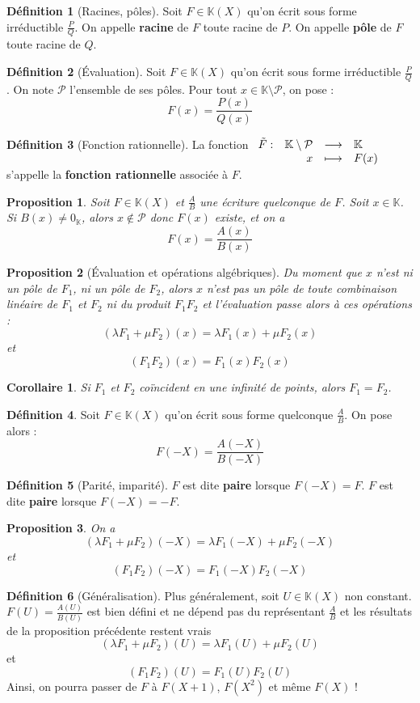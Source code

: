 \documentclass[french]{book}
\newcommand{\K}{\mathbb{K}}
\theoremstyle{plain}
\newtheorem{prop}{Proposition}[chapter]
\newtheorem{cor}{Corollaire}[chapter]
\theoremstyle{definition}
\newtheorem{dfn}{Définition}[chapter]
\theoremstyle{remark}
\begin{document}
\begin{dfn}[Racines, pôles]
	Soit $F\in\K(X)$ qu'on écrit sous forme irréductible $\displaystyle \frac{P}{Q}$. On appelle \textbf{racine} de $F$ toute racine de $P$. On appelle \textbf{pôle} de $F$ toute racine de $Q$.
\end{dfn}
\begin{dfn}[Évaluation]
	Soit $F\in\K(X)$ qu'on écrit sous forme irréductible $\displaystyle \frac{P}{Q}$. On note $\mathcal{P}$ l'ensemble de ses pôles. Pour tout $x\in\K\setminus\mathcal{P}$, on pose : $$F(x)=\frac{P(x)}{Q(x)}$$
\end{dfn}
\begin{dfn}[Fonction rationnelle]
	La fonction $\begin{array}[t]{lrcl}
		\tilde{F}: & \K\setminus\mathcal{P} & \longrightarrow & \K \\
		& x & \longmapsto & F(x)
	\end{array}
	$ s'appelle la \textbf{fonction rationnelle} associée à $F$.
\end{dfn}
\begin{prop}
	Soit $F\in\K(X)$ et $\displaystyle\frac{A}{B}$ une écriture quelconque de $F$. Soit $x\in\K$. Si $B(x)\ne0_\K$, alors $x\notin\mathcal{P}$ donc $F(x)$ existe, et on a $$F(x)=\frac{A(x)}{B(x)}$$
\end{prop}
\begin{prop}[Évaluation et opérations algébriques]
	Du moment que $x$ n'est ni un pôle de $F_1$, ni un pôle de $F_2$, alors $x$ n'est pas un pôle de toute combinaison linéaire de $F_1$ et $F_2$ ni du produit $F_1F_2$ et l'évaluation passe alors à ces opérations : $$(\lambda F_1+\mu F_2)(x)=\lambda F_1(x)+\mu F_2(x)$$ et $$(F_1F_2)(x)=F_1(x)F_2(x)$$
\end{prop}
\begin{cor}
	Si $F_1$ et $F_2$ coïncident en une infinité de points, alors $F_1=F_2$.
\end{cor}
\begin{dfn}
	Soit $F\in\K(X)$ qu'on écrit sous forme quelconque $\displaystyle \frac{A}{B}$. On pose alors : $$F(-X)=\frac{A(-X)}{B(-X)}$$
\end{dfn}
\begin{dfn}[Parité, imparité]
	$F$ est dite \textbf{paire} lorsque $F(-X)=F$. $F$ est dite \textbf{paire} lorsque $F(-X)=-F$.
\end{dfn}
\begin{prop}
	On a $$(\lambda F_1+\mu F_2)(-X)=\lambda F_1(-X)+\mu F_2(-X)$$ et $$(F_1F_2)(-X)=F_1(-X)F_2(-X)$$
\end{prop}
\begin{dfn}[Généralisation]
	Plus généralement, soit $U\in\K(X)$ non constant. $\displaystyle F(U)=\frac{A(U)}{B(U)}$ est bien défini et ne dépend pas du représentant $\displaystyle\frac{A}{B}$ et les résultats de la proposition précédente restent vrais $$(\lambda F_1+\mu F_2)(U)=\lambda F_1(U)+\mu F_2(U)$$ et $$(F_1F_2)(U)=F_1(U)F_2(U)$$ Ainsi, on pourra passer de $F$ à $F(X+1)$, $F(X^2)$ et même $F(X)$ !
\end{dfn}
\end{document}
